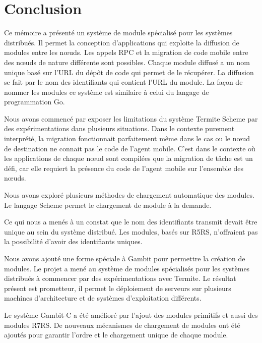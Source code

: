 
\chapter{Conclusion}

Ce mémoire a présenté un système de module spécialisé pour les systèmes
distribués. Il permet la conception d'applications qui exploite la diffusion de
modules entre les nœuds. Les appels RPC et la migration de code mobile entre
des nœuds de nature différente sont possibles. Chaque module diffusé a un nom
unique basé sur l'URL du dépôt de code qui permet de le récupérer. La diffusion
se fait par le nom des identifiants qui contient l'URL du module. La façon de nommer les
modules ce système est similaire à celui du langage de programmation Go.

Nous avons commencé par exposer les limitations du système Termite Scheme par
des expérimentations dans plusieurs situations. Dans le contexte purement
interprété, la migration fonctionnait parfaitement même dans le cas ou le nœud de
destination ne connait pas le code de l'agent mobile.  C'est dans le contexte
où les applications de chaque nœud sont compilées que la migration de tâche
est un défi, car elle requiert la présence du code de l'agent mobile sur l'ensemble
des nœuds.

Nous avons exploré plusieurs méthodes de chargement automatique des modules.
Le langage Scheme permet le chargement de module à la demande.

Ce qui nous a menés à un constat que le nom des identifiants transmit devait
être unique au sein du système distribué. Les modules, basés sur R5RS,
n'offraient pas la possibilité d'avoir des identifiants uniques.

Nous avons ajouté une forme spéciale à Gambit pour permettre la création de
modules. Le projet a mené au système de modules spécialisés pour les systèmes
distribués à commencer par des expérimentations avec Termite. Le résultat
présent est prometteur, il permet le déploiement de serveurs sur plusieurs
machines d'architecture et de systèmes d'exploitation différents.

Le système Gambit-C a été amélioré par l'ajout des modules primitifs et aussi
des modules R7RS. De nouveaux mécanismes de chargement de modules ont été
ajoutés pour garantir l'ordre et le chargement unique de chaque module.


